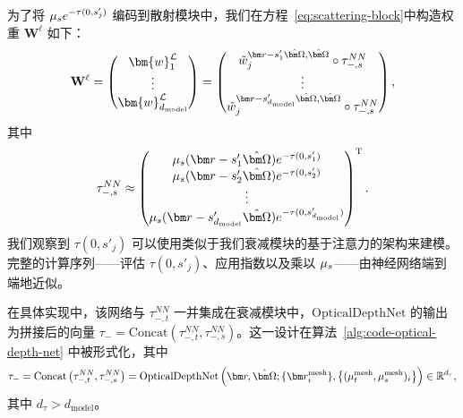 为了将 $\mu_s e^{-\tau(0,s'_j)}$ 编码到散射模块中，我们在方程~\eqref{eq:scattering-block}中构造权重 $\bm{W}^\ell$ 如下：
\begin{equation}
    \mathbf{W}^\ell =
    \begin{pmatrix}
        \bm{w}^\cL_1 \\
        \vdots       \\
        \bm{w}^\cL_{d_{\text{model}}}
    \end{pmatrix}
    =
    \begin{pmatrix}
        \tilde{w}_j^{\br-s'_1 \bOmega, \bOmega}\circ \tau^{NN}_{-,s} \\
        \vdots                                                       \\
        \tilde{w}_j^{\br-s'_{d_\mathrm{model}} \bOmega, \bOmega} \circ \tau^{NN}_{-,s}
    \end{pmatrix},
\end{equation}
其中
\begin{equation}
    \tau^{NN}_{-,s} \approx
    \begin{pmatrix}
        \mus(\br-s'_1\bOmega) e^{-\tau(0,s'_1)} \\
        \mus(\br-s'_2\bOmega) e^{-\tau(0,s'_2)} \\
        \vdots                                  \\
        \mus(\br-s'_{d_{\mathrm{model}}}\bOmega) e^{-\tau(0,s'_{d_{\mathrm{model}}})}
    \end{pmatrix}\transpose.
\end{equation}
我们观察到 $\tau(0,s'_j)$ 可以使用类似于我们衰减模块的基于注意力的架构来建模。完整的计算序列——评估 $\tau(0,s'_j)$、应用指数以及乘以 $\mu_s$——由神经网络端到端地近似。

在具体实现中，该网络与 $\tau^{NN}_{-,t}$ 一并集成在衰减模块中，$\mathrm{OpticalDepthNet}$ 的输出为拼接后的向量 $\tau_- = \mathrm{Concat}(\tau^{NN}_{-,t}, \tau^{NN}_{-,s})$。这一设计在算法~\ref{alg:code-optical-depth-net} 中被形式化，其中
\begin{equation}
    \tau_- = \mathrm{Concat}\left(\tau^{NN}_{-,t}, \tau^{NN}_{-,s}\right) = \mathrm{OpticalDepthNet}\left(\br,\bOmega; \{\br^{\mathrm{mesh}}_i\}, \left\{(\mu_t^{\mathrm{mesh}}, \mu_s^{\mathrm{mesh}})_i\right\}\right) \in \mathbb{R}^{d_{\tau}},
\end{equation}
其中 $d_\tau > d_{\mathrm{model}}$。

